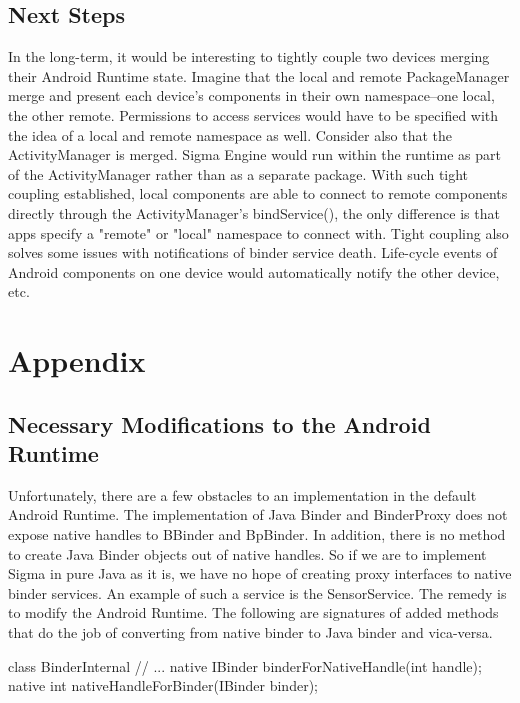 \documentclass[prodmode]{acmlarge}
\begin{document}
\subsection{Next Steps}
\label{sec:NextSteps}
In the long-term, it would be interesting to tightly couple two devices merging their Android Runtime state. Imagine that the local and remote PackageManager merge and present each device's components in their own namespace--one local, the other remote. Permissions to access services would have to be specified with the idea of a local and remote namespace as well. Consider also that the ActivityManager is merged. Sigma Engine would run within the runtime as part of the ActivityManager rather than as a separate package. With such tight coupling established, local components are able to connect to remote components directly through the ActivityManager's bindService(), the only difference is that apps specify a "remote" or "local" namespace to connect with. Tight coupling also solves some issues with notifications of binder service death. Life-cycle events of Android components on one device would automatically notify the other device, etc.



\section{Appendix}

\subsection{Necessary Modifications to the Android Runtime}
\label{sec:AndroidRuntimeModifications}
Unfortunately, there are a few obstacles to an implementation in the default Android Runtime. The implementation of Java Binder and BinderProxy does not expose native handles to BBinder and BpBinder. In addition, there is no method to create Java Binder objects out of native handles. So if we are to implement Sigma in pure Java as it is, we have no hope of creating proxy interfaces to native binder services. An example of such a service is the SensorService. The remedy is to modify the Android Runtime. The following are signatures of added methods that do the job of converting from native binder to Java binder and vica-versa.

\begin{snippet}
class BinderInternal {
  // ...
  native IBinder binderForNativeHandle(int handle);
  native int nativeHandleForBinder(IBinder binder);
}
\end{snippet}
\end{document}
